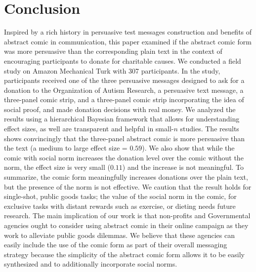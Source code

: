 \section{Conclusion}
\label{sec:Conclusion}

Inspired by a rich history in persuasive test messages construction and benefits of abstract comic in communication, this paper examined if the abstract comic form was more persuasive than the corresponding plain text in the context of encouraging participants to donate for charitable causes. We conducted a field study on Amazon Mechanical Turk with 307 participants. In the study, participants received one of the three persuasive messages designed to ask for a donation to the Organization of Autism Research, a persuasive text message, a three-panel comic strip, and a three-panel comic strip incorporating the idea of social proof, and made donation decisions with real money. We analyzed the results using a hierarchical Bayesian framework that allows for understanding effect sizes, as well are transparent and helpful in small-$n$ studies. The results shows convincingly that the three-panel abstract comic is more persuasive than the text (a medium to large effect size = $0.59$). We also show that while the comic with social norm increases the donation level over the comic without the norm, the effect size is very small ($0.11$) and the increase is not meaningful. To summarize, the comic form meaningfully increases donations over the plain text, but the presence of the norm is not effective. We caution that the result holds for single-shot, public goods tasks; the value of the social norm in the comic, for exclusive tasks with distant rewards such as exercise, or dieting needs future research. The main implication of our work is that non-profits and Governmental agencies ought to consider using abstract comic in their online campaign as they work to alleviate public goods dilemmas. We believe that these agencies can easily include the use of the comic form as part of their overall messaging strategy because the simplicity of the abstract comic form allows it to be easily synthesized and to additionally incorporate social norms. 





